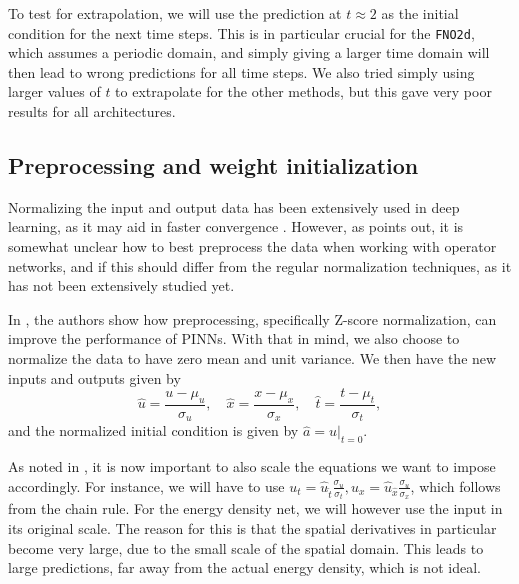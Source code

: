 To test for extrapolation, we will use the prediction at \(t\approx 2\) as the initial condition for the next time steps.
This is in particular crucial for the \texttt{FNO2d}, which assumes a periodic domain, and simply giving a larger time domain will then lead to wrong predictions for all time steps.
We also tried simply using larger values of \(t\) to extrapolate for the other methods, but this gave very poor results for all architectures.

\subsection{Preprocessing and weight initialization}\label{sec:scaling}

Normalizing the input and output data has been extensively used in deep learning, as it may aid in faster convergence .
However, as  points out, it is somewhat unclear how to best preprocess the 
data when working with operator networks, and if this should differ from the regular normalization techniques, as it has not been extensively studied yet.

In , the authors show how preprocessing, specifically Z-score normalization, can improve the performance of PINNs.
With that in mind, we also choose to normalize the data to have zero mean and unit variance.
We then have the new inputs and outputs given by
\begin{equation}
    \hat{u} = \frac{u - \mu_u}{\sigma_u}, \quad \hat{x} = \frac{x - \mu_x}{\sigma_x}, \quad \hat{t} = \frac{t - \mu_t}{\sigma_t},
    \label{eq:preprocessing}
\end{equation}
and the normalized initial condition is given by \(\hat{a} = \hat{u}|_{t=0}\).

As noted in \cite{xuPreprocessingPhysicsinformedNeural2024}, it is now important to also scale the equations we want to impose accordingly.
For instance, we will have to use \(u_t = \hat{u}_{\hat{t}} \frac{\sigma_u}{\sigma_t}, u_x = \hat{u}_{\hat{x}} \frac{\sigma_u}{\sigma_x}\), which follows from the chain rule.
For the energy density net, we will however use the input in its original scale. The reason for this is that the spatial derivatives in particular become very large, due to the small scale of the spatial domain.
This leads to large predictions, far away from the actual energy density, which is not ideal.

